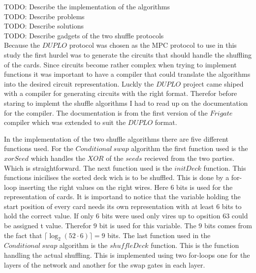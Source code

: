 \documentclass[twoside,11pt,openright]{report}
\newcommand{\todo}[1]{}
\renewcommand{\todo}[1]{{\color{red} TODO: {#1}} \\}
\begin{document}
\todo{Describe the implementation of the algorithms}
\todo{Describe problems}
\todo{Describe solutions}
\todo{Describe gadgets of the two shuffle protocols}

Because the $DUPLO$ protocol was chosen as the MPC protocol to use in this study the first hurdel was to generate the circuits that should handle the shuffling of the cards. Since circuits become rather complex when trying to implement functions it was important to have a compiler that could translate the algorithms into the desired circuit representation. Luckly the $DUPLO$ project came shiped with a compiler for generating circuits with the right format. Therefor before staring to implemt the shuffle algorithms I had to read up on the documentation for the compiler. The documentation is from the first version of the $Frigate$ compiler which was extended to suit the $DUPLO$ format. 

\bigskip

In the implementation of the two shuffle algorithms there are five different functions used. For the $Conditional~swap$ algorithm the first function used is the $xorSeed$ which handles the $XOR$ of the $seeds$ recieved from the two parties. Which is straightforward. The next function used is the $initDeck$ function. This functions inicilises the sorted deck wich is to be shuffled. This is done by a for-loop inserting the right values on the right wires. Here $6$ bits is used for the representation of cards. It is importand to notice that the variable holding the start position of every card needs its own representation with at least $6$ bits to hold the correct value. If only $6$ bits were used only vires up to opsition $63$ could be assigned t value. Therefor $9$ bit is used for this variable. The $9$ bits comes from the fact that $\lceil \log_2(52\cdot 6)\rceil=9$ bits. The last function used in the $Conditional~swap$ algorithm is the $shuffleDeck$ function. This is the function handling the actual shuffling. This is implemented using two for-loops one for the layers of the network and another for the swap gates in each layer.

\bigskip
\end{document}
